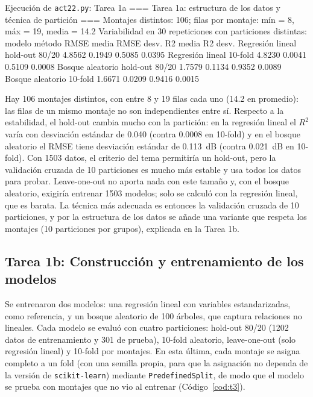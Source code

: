 \documentclass[11pt,letterpaper]{article}
\begin{document}
\begin{consola}[label=out:t2]{Ejecución de \texttt{act22.py}: Tarea 1a}
=== Tarea 1a: estructura de los datos y técnica de partición ===
Montajes distintos: 106; filas por montaje: mín = 8, máx = 19, media = 14.2
Variabilidad en 30 repeticiones con particiones distintas:
          modelo         método  RMSE media  RMSE desv.  R2 media  R2 desv.
Regresión lineal hold-out 80/20      4.8562      0.1949    0.5085    0.0395
Regresión lineal        10-fold      4.8230      0.0041    0.5109    0.0008
Bosque aleatorio hold-out 80/20      1.7579      0.1134    0.9352    0.0089
Bosque aleatorio        10-fold      1.6671      0.0209    0.9416    0.0015
\end{consola}

Hay 106 montajes distintos, con entre 8 y 19 filas cada uno (14.2 en promedio): las filas de un mismo montaje no son independientes entre sí. Respecto a la estabilidad, el hold-out cambia mucho con la partición: en la regresión lineal el $R^2$ varía con desviación estándar de 0.040 (contra 0.0008 en 10-fold) y en el bosque aleatorio el RMSE tiene desviación estándar de 0.113~dB (contra 0.021~dB en 10-fold). Con 1503 datos, el criterio del tema permitiría un hold-out, pero la validación cruzada de 10 particiones es mucho más estable y usa todos los datos para probar. Leave-one-out no aporta nada con este tamaño y, con el bosque aleatorio, exigiría entrenar 1503 modelos; solo se calculó con la regresión lineal, que es barata. La técnica más adecuada es entonces la validación cruzada de 10 particiones, y por la estructura de los datos se añade una variante que respeta los montajes (10 particiones por grupos), explicada en la Tarea 1b.

\subsection{Tarea 1b: Construcción y entrenamiento de los modelos}

Se entrenaron dos modelos: una regresión lineal con variables estandarizadas, como referencia, y un bosque aleatorio de 100 árboles, que captura relaciones no lineales. Cada modelo se evaluó con cuatro particiones: hold-out 80/20 (1202 datos de entrenamiento y 301 de prueba), 10-fold aleatorio, leave-one-out (solo regresión lineal) y 10-fold por montajes. En esta última, cada montaje se asigna completo a un fold (con una semilla propia, para que la asignación no dependa de la versión de \texttt{scikit-learn}) mediante \texttt{PredefinedSplit}, de modo que el modelo se prueba con montajes que no vio al entrenar (Código~\ref{cod:t3}).
\end{document}
